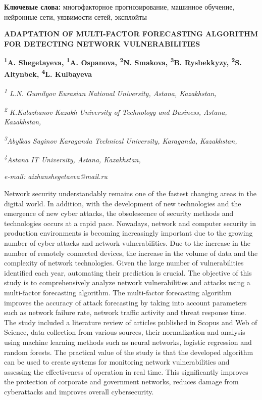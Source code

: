 {\bfseries Ключевые слова:} многофакторное прогнозирование, машинное
обучение, нейронные сети, уязвимости сетей, эксплойты

\begin{articleheader}
{\bfseries ADAPTATION OF MULTI-FACTOR FORECASTING ALGORITHM FOR DETECTING NETWORK VULNERABILITIES}

{\bfseries
\textsuperscript{1}A. Shegetayeva\textsuperscript{\envelope },
\textsuperscript{1}A. Ospanova,
\textsuperscript{2}N. Smakova,
\textsuperscript{3}B. Rysbekkyzy,
\textsuperscript{2}S. Altynbek,
\textsuperscript{4}L. Kulbayeva}
\end{articleheader}

\begin{affiliation}

\emph{\textsuperscript{1} L.N. Gumilyov Eurasian National University, Astana, Kazakhstan,}

\emph{\textsuperscript{2} K.Kulazhanov Kazakh University of Technology and Business, Astana, Kazakhstan,}

\emph{\textsuperscript{3}Abylkas Saginov Karaganda Technical University, Karaganda, Kazakhstan,}

\emph{\textsuperscript{4}Astana IT University, Astana, Kazakhstan,}

\emph{e-mail: aizhanshegetaeva@mail.ru}
\end{affiliation}

Network security understandably remains one of the fastest changing
areas in the digital world. In addition, with the development of new
technologies and the emergence of new cyber attacks, the obsolescence of
security methods and technologies occurs at a rapid pace. Nowadays,
network and computer security in production environments is becoming
increasingly important due to the growing number of cyber attacks and
network vulnerabilities. Due to the increase in the number of remotely
connected devices, the increase in the volume of data and the complexity
of network technologies. Given the large number of vulnerabilities
identified each year, automating their prediction is crucial. The
objective of this study is to comprehensively analyze network
vulnerabilities and attacks using a multi-factor forecasting algorithm.
The multi-factor forecasting algorithm improves the accuracy of attack
forecasting by taking into account parameters such as network failure
rate, network traffic activity and threat response time. The study
included a literature review of articles published in Scopus and Web of
Science, data collection from various sources, their normalization and
analysis using machine learning methods such as neural networks,
logistic regression and random forests. The practical value of the study
is that the developed algorithm can be used to create systems for
monitoring network vulnerabilities and assessing the effectiveness of
operation in real time. This significantly improves the protection of
corporate and government networks, reduces damage from cyberattacks and
improves overall cybersecurity.

